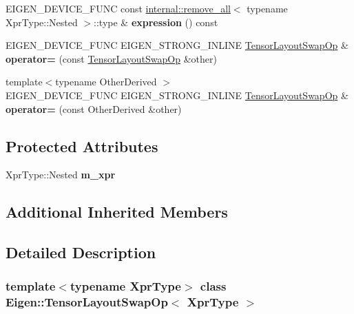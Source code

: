\begin{DoxyCompactItemize}
\mbox{\label{class_eigen_1_1_tensor_layout_swap_op_a0cb5a25065f61d8de7719da2089ff4eb}} 
E\+I\+G\+E\+N\+\_\+\+D\+E\+V\+I\+C\+E\+\_\+\+F\+U\+NC const \hyperlink{struct_eigen_1_1internal_1_1remove__all}{internal\+::remove\+\_\+all}$<$ typename Xpr\+Type\+::\+Nested $>$\+::type \& {\bfseries expression} () const
\item 
\mbox{\label{class_eigen_1_1_tensor_layout_swap_op_a44052f6178184362720fbf14b9011651}} 
E\+I\+G\+E\+N\+\_\+\+D\+E\+V\+I\+C\+E\+\_\+\+F\+U\+NC E\+I\+G\+E\+N\+\_\+\+S\+T\+R\+O\+N\+G\+\_\+\+I\+N\+L\+I\+NE \hyperlink{class_eigen_1_1_tensor_layout_swap_op}{Tensor\+Layout\+Swap\+Op} \& {\bfseries operator=} (const \hyperlink{class_eigen_1_1_tensor_layout_swap_op}{Tensor\+Layout\+Swap\+Op} \&other)
\item 
\mbox{\label{class_eigen_1_1_tensor_layout_swap_op_af35a0c897fc4ba261b73ebec5a1074db}} 
{\footnotesize template$<$typename Other\+Derived $>$ }\\E\+I\+G\+E\+N\+\_\+\+D\+E\+V\+I\+C\+E\+\_\+\+F\+U\+NC E\+I\+G\+E\+N\+\_\+\+S\+T\+R\+O\+N\+G\+\_\+\+I\+N\+L\+I\+NE \hyperlink{class_eigen_1_1_tensor_layout_swap_op}{Tensor\+Layout\+Swap\+Op} \& {\bfseries operator=} (const Other\+Derived \&other)
\end{DoxyCompactItemize}
\subsection*{Protected Attributes}
\begin{DoxyCompactItemize}
\item 
\mbox{\label{class_eigen_1_1_tensor_layout_swap_op_a246483983206d04e6606f9becde4c324}} 
Xpr\+Type\+::\+Nested {\bfseries m\+\_\+xpr}
\end{DoxyCompactItemize}
\subsection*{Additional Inherited Members}


\subsection{Detailed Description}
\subsubsection*{template$<$typename Xpr\+Type$>$\newline
class Eigen\+::\+Tensor\+Layout\+Swap\+Op$<$ Xpr\+Type $>$}



